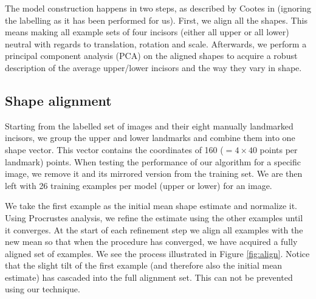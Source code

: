 \documentclass[a4paper,titlepage,12pt]{article}
\begin{document}
The model construction happens in two steps, as described by Cootes in \cite{cootes2000introduction} (ignoring the labelling as it has been performed for us). First, we align all the shapes. This means making all example sets of four incisors (either all upper or all lower) neutral with regards to translation, rotation and scale. Afterwards, we perform a principal component analysis (PCA) on the aligned shapes to acquire a robust description of the average upper/lower incisors and the way they vary in shape. 

\subsection{Shape alignment}
Starting from the labelled set of images and their eight manually landmarked incisors, we group the upper and lower landmarks and combine them into one shape vector. This vector contains the coordinates of 160 ($= 4\times 40$ points per landmark) points. When testing the performance of our algorithm for a specific image, we remove it and its mirrored version from the training set. We are then left with 26 training examples per model (upper or lower) for an image.

We take the first example as the initial mean shape estimate and normalize it. Using Procrustes analysis, we refine the estimate using the other examples until it converges. At the start of each refinement step we align all examples with the new mean so that when the procedure has converged, we have acquired a fully aligned set of examples. We see the process illustrated in Figure \ref{fig:align}. Notice that the slight tilt of the first example (and therefore also the initial mean estimate) has cascaded into the full alignment set. This can not be prevented using our technique.
\end{document}
